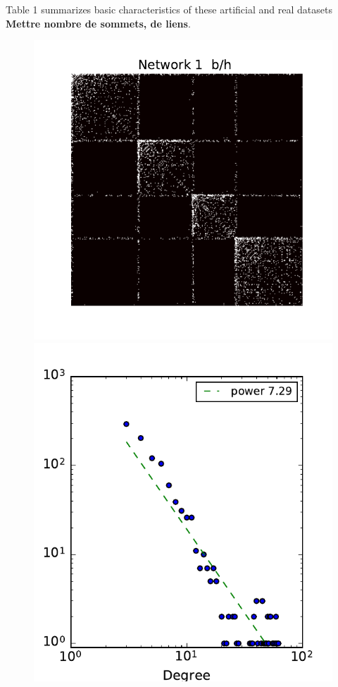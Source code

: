 Table 1 summarizes basic characteristics of these artificial and real datasets \textbf{ Mettre nombre de sommets, de liens}.


\begin{figure}[h]
	\centering
	
	\includegraphics[scale=0.4]{img/g1}
	\endminipage
	\includegraphics[scale=0.4]{img/g1_d}

\end{figure}
